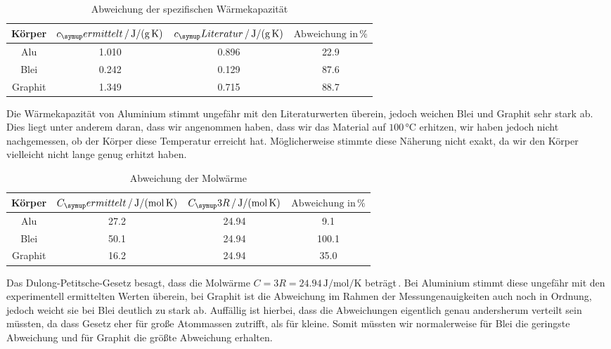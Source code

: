 \begin{table}
  \centering
  \begin{tabular}{c c c c}
    \toprule
    Körper & $c_\su{ermittelt}\,/\,\si{\joule\per\gram\per\kelvin}$ &
    $c_\su{Literatur}\,/\,\si{\joule\per\gram\per\kelvin}$\cite{bleialu} & $\text{Abweichung in}\,\%$ \\
    \midrule
    Alu & 1.010 & 0.896 & 22.9 \\
    Blei & 0.242 & 0.129 & 87.6 \\
    Graphit & 1.349 & 0.715 & 88.7 \\
    \bottomrule
  \end{tabular}
  \caption{Abweichung der spezifischen Wärmekapazität}
\end{table}
Die Wärmekapazität von Aluminium\cite{bleilu} stimmt ungefähr mit den Literaturwerten überein,
jedoch weichen Blei\cite{bleialu} und Graphit \cite{graphit} sehr stark ab.
Dies liegt unter anderem daran,
dass wir angenommen haben, dass wir das Material auf $100\,\si{\celsius}$ erhitzen,
wir haben jedoch nicht nachgemessen, ob der Körper diese Temperatur erreicht hat.
Möglicherweise stimmte diese Näherung nicht exakt, da wir den Körper vielleicht
nicht lange genug erhitzt haben.

\begin{table}
  \centering
  \begin{tabular}{c c c c}
    \toprule
    Körper & $C_\su{ermittelt}\,/\,\si{\joule\per\mol\per\kelvin}$ &
    $C_\su{3R}\,/\,\si{\joule\per\mol\per\kelvin}$ & $\text{Abweichung in} \,\%$ \\
    \midrule
    Alu & 27.2 & 24.94 & 9.1 \\
    Blei & 50.1 & 24.94 & 100.1 \\
    Graphit & 16.2 & 24.94 & 35.0 \\
    \bottomrule
  \end{tabular}
  \caption{Abweichung der Molwärme}
\end{table}
Das Dulong-Petitsche-Gesetz besagt, dass die Molwärme $ C = 3 R = 24.94 \,\si{\joule\per\mol\per\kelvin}$
beträgt\,\cite{chemie}. Bei Aluminium stimmt diese ungefähr mit den experimentell
ermittelten Werten überein, bei Graphit ist die Abweichung im Rahmen der Messungenauigkeiten
auch noch in Ordnung, jedoch weicht sie bei Blei deutlich zu stark ab. Auffällig ist hierbei,
dass die Abweichungen eigentlich genau andersherum verteilt sein müssten, da dass Gesetz
eher für große Atommassen zutrifft, als für kleine. Somit müssten wir normalerweise für Blei
die geringste Abweichung und für Graphit die größte Abweichung erhalten.

